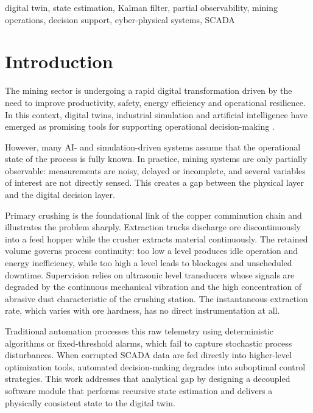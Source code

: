 \documentclass[conference]{IEEEtran}
\begin{document}
\begin{IEEEkeywords}
digital twin, state estimation, Kalman filter, partial observability, mining
operations, decision support, cyber-physical systems, SCADA
\end{IEEEkeywords}

\section{Introduction}

The mining sector is undergoing a rapid digital transformation driven by the
need to improve productivity, safety, energy efficiency and operational
resilience. In this context, digital twins, industrial simulation and artificial
intelligence have emerged as promising tools for supporting operational
decision-making \cite{fuller2020,liu2021,qu2023}.

However, many AI- and simulation-driven systems assume that the operational
state of the process is fully known. In practice, mining systems are only
partially observable: measurements are noisy, delayed or incomplete, and several
variables of interest are not directly sensed. This creates a gap between the
physical layer and the digital decision layer.

Primary crushing is the foundational link of the copper comminution chain and
illustrates the problem sharply. Extraction trucks discharge ore
discontinuously into a feed hopper while the crusher extracts material
continuously. The retained volume governs process continuity: too low a level
produces idle operation and energy inefficiency, while too high a level leads to
blockages and unscheduled downtime. Supervision relies on ultrasonic level
transducers whose signals are degraded by the continuous mechanical vibration
and the high concentration of abrasive dust characteristic of the crushing
station. The instantaneous extraction rate, which varies with ore hardness, has
no direct instrumentation at all.

Traditional automation processes this raw telemetry using deterministic
algorithms or fixed-threshold alarms, which fail to capture stochastic process
disturbances. When corrupted SCADA data are fed directly into higher-level
optimization tools, automated decision-making degrades into suboptimal control
strategies. This work addresses that analytical gap by designing a decoupled
software module that performs recursive state estimation and delivers a
physically consistent state to the digital twin.
\end{document}
